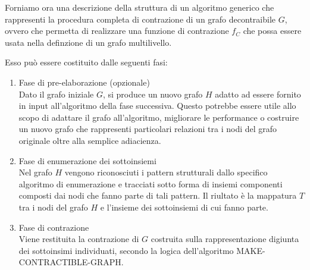 
Forniamo ora una descrizione della struttura di un algoritmo generico che rappresenti la procedura completa di
contrazione di un grafo decontraibile $G$, ovvero che permetta di realizzare una funzione di contrazione $f_C$
che possa essere usata nella definzione di un grafo multilivello.

Esso pu\`o essere costituito dalle seguenti fasi:
\begin{enumerate}
    \item Fase di pre-elaborazione (opzionale) \\
    Dato il grafo iniziale $G$, si produce un nuovo grafo $H$ adatto ad essere fornito in input all'algoritmo
    della fase successiva.
    Questo potrebbe essere utile allo scopo di adattare il grafo all'algoritmo, migliorare le performance o
    costruire un nuovo grafo che rappresenti particolari relazioni tra i nodi del grafo originale oltre alla
    semplice adiacienza.
    \item Fase di enumerazione dei sottoinsiemi \\
    Nel grafo $H$ vengono riconosciuti i pattern strutturali dallo specifico algoritmo di enumerazione e tracciati
    sotto forma di insiemi componenti composti dai nodi che fanno parte di tali pattern.
    Il riultato \`e la mappatura $T$ tra i nodi del grafo $H$ e l'insieme dei sottoinsiemi di cui fanno parte.
    \item Fase di contrazione \\
    Viene restituita la contrazione di $G$ costruita sulla rappresentazione digiunta dei sottoinsimi individuati,
    secondo la logica dell'algoritmo MAKE-CONTRACTIBLE-GRAPH\@.
\end{enumerate}



